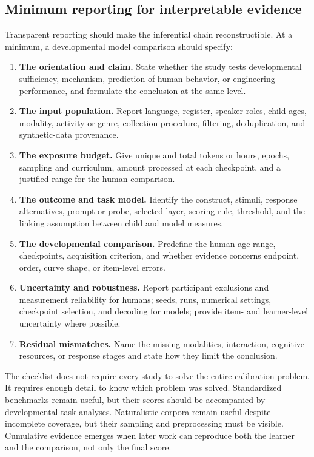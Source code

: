 \subsection{Minimum reporting for interpretable evidence}
\label{sec:litreview:reporting}

Transparent reporting should make the inferential chain reconstructible. At a minimum, a developmental model comparison should specify:

\begin{enumerate}
  \item \textbf{The orientation and claim.} State whether the study tests developmental sufficiency, mechanism, prediction of human behavior, or engineering performance, and formulate the conclusion at the same level.
  \item \textbf{The input population.} Report language, register, speaker roles, child ages, modality, activity or genre, collection procedure, filtering, deduplication, and synthetic-data provenance.
  \item \textbf{The exposure budget.} Give unique and total tokens or hours, epochs, sampling and curriculum, amount processed at each checkpoint, and a justified range for the human comparison.
  \item \textbf{The outcome and task model.} Identify the construct, stimuli, response alternatives, prompt or probe, selected layer, scoring rule, threshold, and the linking assumption between child and model measures.
  \item \textbf{The developmental comparison.} Predefine the human age range, checkpoints, acquisition criterion, and whether evidence concerns endpoint, order, curve shape, or item-level errors.
  \item \textbf{Uncertainty and robustness.} Report participant exclusions and measurement reliability for humans; seeds, runs, numerical settings, checkpoint selection, and decoding for models; provide item- and learner-level uncertainty where possible.
  \item \textbf{Residual mismatches.} Name the missing modalities, interaction, cognitive resources, or response stages and state how they limit the conclusion.
\end{enumerate}

The checklist does not require every study to solve the entire calibration problem. It requires enough detail to know which problem was solved. Standardized benchmarks remain useful, but their scores should be accompanied by developmental task analyses. Naturalistic corpora remain useful despite incomplete coverage, but their sampling and preprocessing must be visible. Cumulative evidence emerges when later work can reproduce both the learner and the comparison, not only the final score.

